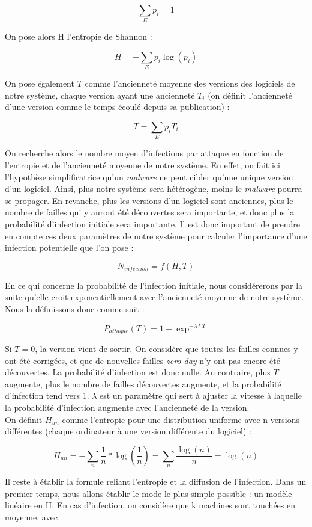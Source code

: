 \[
\sum_{E}p_i=1
\]

On pose alors H l'entropie de Shannon :

\[
H=-\sum_E p_i \log(p_i)
\]

On pose également $T$ comme l'ancienneté moyenne des versions des logiciels de notre système, chaque version ayant une ancienneté $T_i$ (on définit l'ancienneté d'une version comme le temps écoulé depuis sa publication)  :

\[
T=\sum_E p_i T_i
\]

On recherche alors le nombre moyen d'infections par attaque en fonction de l'entropie et de l'ancienneté moyenne de notre système. En effet, on fait ici l'hypothèse simplificatrice qu'un \textit{malware} ne peut cibler qu'une unique version d'un logiciel. Ainsi, plus notre système sera hétérogène, moins le \textit{malware} pourra se propager. En revanche, plus les versions d'un logiciel sont anciennes, plus le nombre de failles qui y auront été découvertes sera importante, et donc plus la probabilité d'infection initiale sera importante. Il est donc important de prendre en compte ces deux paramètres de notre système pour calculer l'importance d'une infection potentielle que l'on pose : 

\[
N_{infection} = f(H,T)
\]

En ce qui concerne la probabilité de l'infection initiale, nous considérerons par la suite qu'elle croit exponentiellement avec l'ancienneté moyenne de notre système. Nous la définissons donc comme suit :

\[
P_{attaque}(T) =1- \exp^{-\lambda*T}
\]

Si $T=0$, la version vient de sortir. On considère que toutes les failles connues y ont été corrigées, et que de nouvelles failles \textit{zero day} n'y ont pas encore été découvertes. La probabilité d'infection est donc nulle. Au contraire, plus $T$ augmente, plus le nombre de failles découvertes augmente, et la probabilité d'infection tend vers 1. $\lambda$ est un paramètre qui sert à ajuster la vitesse à laquelle la probabilité d'infection augmente avec l'ancienneté de la version.\\

On définit $H_{un}$ comme l'entropie pour une distribution uniforme avec n versions différentes (chaque ordinateur à une version différente du logiciel) :

\[
H_{un} = -\sum_n \frac{1}{n} * \log(\frac{1}{n}) = \sum_n \frac{\log(n)}{n} = \log(n)
\]

Il reste à établir la formule reliant l'entropie et la diffusion de l'infection. Dans un premier temps, nous allons établir le mode le plus simple possible : un modèle linéaire en H. En cas d'infection, on considère que k machines sont touchées en moyenne, avec 

